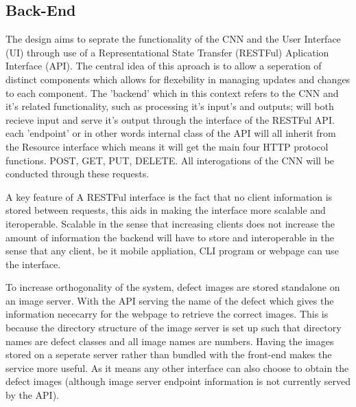     \subsection{Back-End}
      The design aims to seprate the functionality of the CNN and the User Interface (UI) through use of a Representational State Transfer (RESTFul) Aplication Interface (API). The central idea of this aproach is to allow a seperation of distinct components which allows for flexebility in managing updates and changes to each component. The 'backend' which in this context refers to the CNN and it's related functionality, such as processing it's input's and outputs; will both recieve input and serve it's output through the interface of the RESTFul API. each 'endpoint' or in other words internal class of the API will all inherit from the Resource interface which means it will get the main four HTTP protocol functions. POST, GET, PUT, DELETE. All interogations of the CNN will be conducted through these requests.
      \par
      A key feature of A RESTFul interface is the fact that no client information is stored
      between requests, this aids in making the interface more scalable and iteroperable. Scalable in the sense that increasing clients does not increase the amount of information the backend will have to store and interoperable in the sense that any client, be it mobile appliation, CLI program or webpage can use the interface.
      \par
      To increase orthogonality of the system, defect images are stored standalone on an image server. With the API serving the name of the defect which gives the information nececarry for the webpage to retrieve the correct images. This is because the directory structure of the image server is set up such that directory names are defect classes and all image names are numbers. Having the images stored on a seperate server rather than bundled with the front-end makes the service more useful. As it means any other interface can also choose to obtain the defect images (although image server endpoint information is not currently served by the API).

